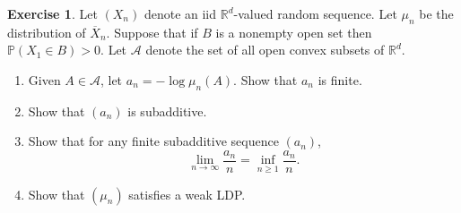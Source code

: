 \documentclass[10pt]{article}
\newcommand{\RR}{\mathbb{R}}
\newcommand{\PP}{\mathbb P}
\theoremstyle{definition}
\newtheorem{exer}{Exercise}
\begin{document}
\begin{exer}
Let $(X_n)$ denote an iid $\RR^d$-valued random sequence. Let $\mu_n$ be the distribution of $\overline X_n$.
Suppose that if $B$ is a nonempty open set then $\PP(X_1 \in B) > 0$.
Let $\mathcal A$ denote the set of all open convex subsets of $\RR^d$.
\begin{enumerate}
\item Given $A \in \mathcal A$, let $a_n = -\log \mu_n(A)$. Show that $a_n$ is finite.
\item Show that $(a_n)$ is subadditive.
\item Show that for any finite subadditive sequence $(a_n)$,
$$\lim_{n \to \infty} \frac{a_n}{n} = \inf_{n \geq 1} \frac{a_n}{n}.$$
\item Show that $(\mu_n)$ satisfies a weak LDP.
\end{enumerate}
\end{exer}
\end{document}
